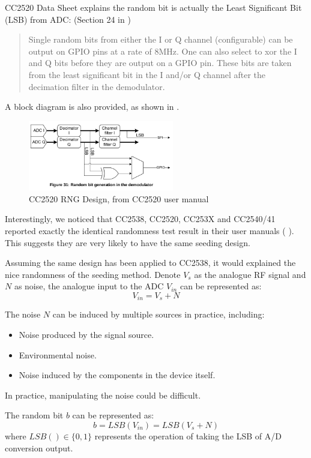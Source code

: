 CC2520 Data Sheet\cite{CC2520Manual} explains the random bit is actually the Least Significant Bit (LSB) from ADC: (Section 24 in \cite{CC2520Manual})
\begin{quote}
Single random bits from either the I or Q channel (configurable) can be output on GPIO pins at a rate of 8MHz. One can also select to xor the I and Q bits before they are output on a GPIO pin. These bits are taken from the least significant bit in the I and/or Q channel after the decimation filter in the demodulator.
\end{quote}

A block diagram is also provided, as shown in .
\begin{figure}[!t]
\centering
\includegraphics[width=2.5in]{fig/CC2520_RNG.png}
\caption{CC2520 RNG Design, from CC2520 user manual\cite{CC2520Manual}}
\label{CC2520RFRND}
\end{figure}

Interestingly, we noticed that CC2538, CC2520, CC253X and CC2540/41 reported exactly the identical randomness test result in their user manuals (\cite{CC2538Manual} \cite{ CC2520Manual} \cite{CC2530Manual}). This suggests they are very likely to have the same seeding design.

Assuming the same design has been applied to CC2538, it would explained the nice randomness of the seeding method. Denote $V_s$ as the analogue RF signal and $N$ as noise, the analogue input to the ADC $V_{in}$ can be represented as:
\begin{equation} \label{V_in}
V_{in} = V_s + N
\end{equation}

The noise $N$ can be induced by multiple sources in practice, including:
\begin{itemize}
\item Noise produced by the signal source.
\item Environmental noise.
\item Noise induced by the components in the device itself.
\end{itemize}
In practice, manipulating the noise could be difficult.

The random bit $b$ can be represented as:
\begin{equation} \label{RNDOutput}
b = LSB(V_{in}) = LSB(V_s + N)
\end{equation}
where $LSB() \in \{0,1\}$ represents the operation of taking the LSB of A/D conversion output.

